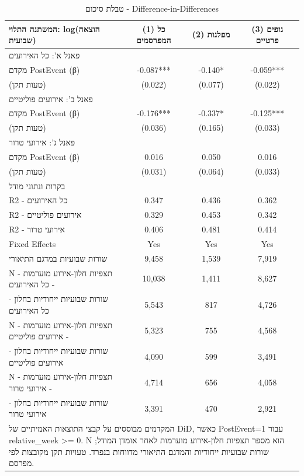 \begin{table}[!htbp]
\centering
\caption{טבלת סיכום - Difference-in-Differences}
\label{tab:did_panel_summary_post_from_0}
\begin{tabular}{lccc}
\hline\hline
המשתנה התלוי: log(הוצאה שבועית) & (1) כל המפרסמים & (2) מפלגות & (3) גופים פרטיים \\
\hline
\multicolumn{4}{l}{פאנל א': כל האירועים} \\
מקדם PostEvent (β) & -0.087*** & -0.140* & -0.059*** \\
(טעות תקן) & (0.022) & (0.077) & (0.022) \\
\multicolumn{4}{l}{פאנל ב': אירועים פוליטיים} \\
מקדם PostEvent (β) & -0.176*** & -0.337* & -0.125*** \\
(טעות תקן) & (0.036) & (0.165) & (0.033) \\
\multicolumn{4}{l}{פאנל ג': אירועי טרור} \\
מקדם PostEvent (β) & 0.016 & 0.050 & 0.016 \\
(טעות תקן) & (0.031) & (0.064) & (0.033) \\
\multicolumn{4}{l}{בקרות ונתוני מודל} \\
R2 - כל האירועים & 0.347 & 0.436 & 0.362 \\
R2 - אירועים פוליטיים & 0.329 & 0.453 & 0.342 \\
R2 - אירועי טרור & 0.406 & 0.481 & 0.414 \\
Fixed Effects & Yes & Yes & Yes \\
שורות שבועיות במדגם התיאורי & 9,458 & 1,539 & 7,919 \\
N - תצפיות חלון-אירוע מוערמות - כל האירועים & 10,038 & 1,411 & 8,627 \\
שורות שבועיות ייחודיות בחלון - כל האירועים & 5,543 & 817 & 4,726 \\
N - תצפיות חלון-אירוע מוערמות - אירועים פוליטיים & 5,323 & 755 & 4,568 \\
שורות שבועיות ייחודיות בחלון - אירועים פוליטיים & 4,090 & 599 & 3,491 \\
N - תצפיות חלון-אירוע מוערמות - אירועי טרור & 4,714 & 656 & 4,058 \\
שורות שבועיות ייחודיות בחלון - אירועי טרור & 3,391 & 470 & 2,921 \\
\hline
\multicolumn{4}{l}{\footnotesize המקדמים מבוססים על קבצי התוצאות האמיתיים של DiD, כאשר PostEvent=1 עבור relative\_week >= 0. N הוא מספר תצפיות חלון-אירוע מוערמות לאחר אומדן המודל; שורות שבועיות ייחודיות והמדגם התיאורי מדווחות בנפרד. טעויות תקן מקובצות לפי מפרסם.} \\
\hline\hline
\end{tabular}
\end{table}
